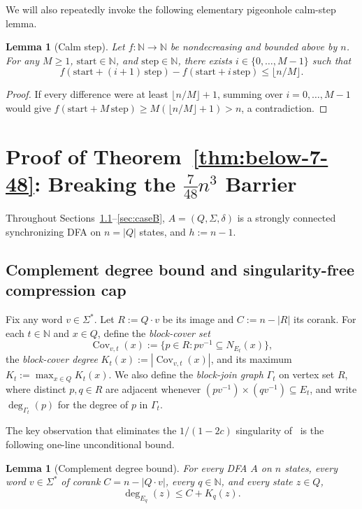 \documentclass[11pt]{article}
\newtheorem{lemma}[theorem]{Lemma}
\theoremstyle{definition}
\theoremstyle{remark}
\newcommand{\Cov}{\operatorname{Cov}}
\newcommand{\N}{\mathbb{N}}
\begin{document}
We will also repeatedly invoke the following elementary pigeonhole calm-step lemma.

\begin{lemma}[Calm step]\label{lem:calm-step}
Let $f : \N \to \N$ be nondecreasing and bounded above by $n$. For any $M \ge 1$, $\mathrm{start} \in \N$, and $\mathrm{step} \in \N$, there exists $i \in \{0, \dots, M - 1\}$ such that
\[
  f(\mathrm{start} + (i + 1)\,\mathrm{step}) - f(\mathrm{start} + i\,\mathrm{step}) \le \lfloor n / M \rfloor.
\]
\end{lemma}

\begin{proof}
If every difference were at least $\lfloor n / M \rfloor + 1$, summing over $i = 0, \dots, M - 1$ would give $f(\mathrm{start} + M\,\mathrm{step}) \ge M(\lfloor n / M \rfloor + 1) > n$, a contradiction.
\end{proof}

\section{Proof of Theorem~\ref{thm:below-7-48}: Breaking the \texorpdfstring{$\frac{7}{48} n^3$}{7/48 n\textasciicircum 3} Barrier}\label{sec:below-7-48}

Throughout Sections~\ref{sec:cap}--\ref{sec:caseB}, $A = (Q, \Sigma, \delta)$ is a strongly connected synchronizing DFA on $n = |Q|$ states, and $h := n - 1$.

\subsection{Complement degree bound and singularity-free compression cap}\label{sec:cap}

Fix any word $v \in \Sigma^*$. Let $R := Q \cdot v$ be its image and $C := n - |R|$ its corank. For each $t \in \N$ and $x \in Q$, define the \emph{block-cover set}
\[
  \Cov_{v, t}(x) := \{ p \in R : p v^{-1} \subseteq N_{E_t}(x) \},
\]
the \emph{block-cover degree} $K_t(x) := |\Cov_{v, t}(x)|$, and its maximum $K_t := \max_{x \in Q} K_t(x)$. We also define the \emph{block-join graph} $\Gamma_t$ on vertex set $R$, where distinct $p, q \in R$ are adjacent whenever $(p v^{-1}) \times (q v^{-1}) \subseteq E_t$, and write $\deg_{\Gamma_t}(p)$ for the degree of $p$ in $\Gamma_t$.

The key observation that eliminates the $1/(1 - 2c)$ singularity of~\cite{Hong2026b} is the following one-line unconditional bound.

\begin{lemma}[Complement degree bound]\label{lem:complement-deg}
For \emph{every} DFA $A$ on $n$ states, every word $v \in \Sigma^*$ of corank $C = n - |Q \cdot v|$, every $q \in \N$, and every state $z \in Q$,
\[
  \deg_{E_q}(z) \le C + K_q(z).
\]
\end{lemma}
\end{document}
